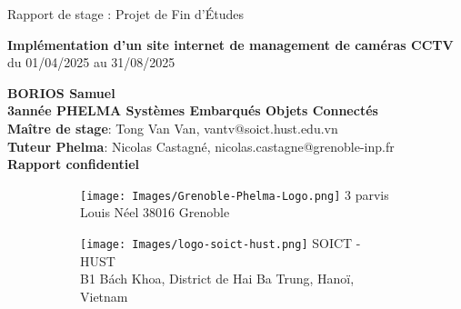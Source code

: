 
\hypersetup{pageanchor=false}
\begin{titlepage}
    \begin{center}
        \vspace*{1cm}
        \Large
        Rapport de stage : Projet de Fin d’Études


        \vspace{0.5cm}
        \Huge
        \textbf{Implémentation d'un site internet de management de caméras CCTV}\\
        
        \vspace{0.5cm}
        \large
        du 01/04/2025 au 31/08/2025

        \vspace{1.5cm}
        \Large
        \textbf{BORIOS Samuel}\\
        
        \vspace{0.5cm}
        \large
        \textbf{3\ieme année PHELMA  Systèmes Embarqués Objets Connectés}\\
        \vspace{2cm}
        \textbf{Maître de stage}: Tong Van Van, vantv@soict.hust.edu.vn\\
        \textbf{Tuteur Phelma}: Nicolas Castagné, nicolas.castagne@grenoble-inp.fr\\
        
        \vspace{2cm}
        \Large
        \textbf{Rapport confidentiel}

        \vfill

\begin{figure}[H]
        \begin{subfigure}[t]{0.4\textwidth}
        \texttt{[image: Images/Grenoble-Phelma-Logo.png]}
        \centering
        \large
        3 parvis Louis Néel      38016 Grenoble
        \label{logo-Phelma}
    \end{subfigure}%
    \hfill
    \begin{subfigure}[t]{0.4\textwidth}
        \texttt{[image: Images/logo-soict-hust.png]}
        \centering
        \large
        SOICT - HUST\\
        B1 Bách Khoa, District de Hai Ba Trung, Hanoï, Vietnam
        \label{logo-entreprise}
    \end{subfigure}
    \label{logos}
\end{figure}
        \vfill
    \end{center}
\end{titlepage}


